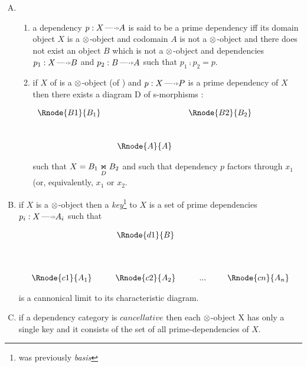 \documentclass[10pt,a4paper]{scrartcl}
\begin{document}
\begin{enumerate} [A.,leftmargin=0.5cm]
such that $X=\fibrex{B_1}{B_2}{D}$ .
\item
\begin{enumerate}[label*=\arabic*]
\item
{}
a dependency $p:X \dmorph A$ is said to be a prime dependency iff its domain object $X$ is a $\otimes$-object and 
codomain $A$ is not a $\otimes$-object and there does not exist an object $B$ which is not a $\otimes$-object and dependencies $p_1:X \dmorph B$ and $p_2: B \dmorph A$ such that $p_1 \comp p_2 = p$. 
\item
{}
if $X$ of is  a $\otimes$-object (of )
and $p:X \dmorph  P$ is a prime dependency of $X$ then there exists
a diagram D of s-morphisms :
	\begin{center}
$
\begin{array}{cp{0cm}cp{0cm}c}
\Rnode{B1}{B_1}& &            &  &\Rnode{B2}{B_2} \\ [1.0cm]
               & &\Rnode{A}{A}& &
\end{array}
$
\end{center}


such that $X=\fibrex{B_1}{B_2}{D}$  and such that dependency $p$ factors through $x_1$ (or, equivalently, $x_1$ or $x_2$. 
\end{enumerate}

\item 
{}
if $X$ is a $\otimes$-object then a \textit{key}\footnote{was previously \textit{basis}} to $X$ is a set of prime dependencies $p_i: X \dmorph A_i$ 
such that 
\begin{center}
\begin{displaymath}
\begin{array}{cp{0.3cm}c         p{0.3cm}  c p{0.2cm} c}
               & & \Rnode{d1}{B} & &     & &  \\ [1.4cm]
\Rnode{c1}{A_1}& &\Rnode{c2}{A_2}& & ... & &\Rnode{cn}{A_n}
\end{array}
\end{displaymath}
\end{center}

is a cannonical limit to its characteristic diagram.
\item
{}
if a dependency category  is $cancellative$ then each $\otimes$-object X has only a single key and it consists 
of the set of all prime-dependencies of $X$.


\end{enumerate}
\end{document}
